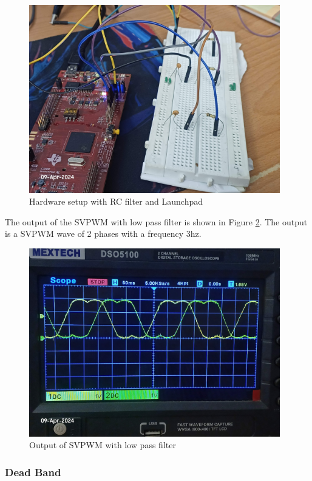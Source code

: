\begin{figure}
	\centering
	\includegraphics[width=4.3in]{sections/section6/images/SVPWM/LPFandC2000.jpg}
	\caption{Hardware setup with RC filter and Launchpad}
	\label{fig:hardwareSetupLPF}
\end{figure}

The output of the SVPWM with low pass filter is shown in Figure \ref{fig:OutputLPF}. The output is a SVPWM wave of 2 phases with a frequency 3hz.


\begin{figure}
	\centering
	\includegraphics[width=4.3in]{sections/section6/images/SVPWM/SVPWM2phases.jpg}
	\caption{Output of SVPWM with low pass filter}
	\label{fig:OutputLPF}
\end{figure}


\subsubsection{Dead Band}

